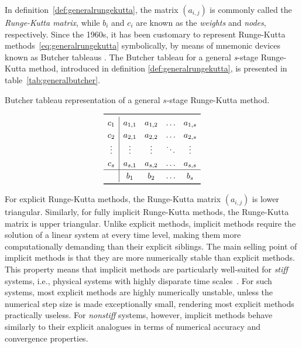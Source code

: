 In definition~\ref{def:generalrungekutta}, the matrix $(a_{i,j})$ is commonly
called the \emph{Runge-Kutta matrix}, while $b_{i}$ and $c_{i}$ are known as
the \emph{weights} and \emph{nodes}, respectively.  Since the 1960s, it has
been customary to represent Runge-Kutta methods~\eqref{eq:generalrungekutta}
symbolically, by means of mnemonic devices known as Butcher tableaus
\parencite[p.134 in the 2008 printing]{hairer1993solving}. The Butcher tableau
for a general \emph{s}-stage Runge-Kutta method, introduced in definition
\ref{def:generalrungekutta}, is presented in table~\ref{tab:generalbutcher}.

\begin{table}[htpb]
    \centering
    \caption[Butcher tableau representation of a general $s$-stage
                Runge-Kutta method]{Butcher tableau representation of a general
                    $s$-stage Runge-Kutta method.}
    \label{tab:generalbutcher}
    \[\renewcommand{\arraystretch}{1.25}
        \begin{array}{c|cccc}
            \toprule
            c_{1} & a_{1,1} & a_{1,2} & \ldots & a_{1,s}\\
            c_{2} & a_{2,1} & a_{2,2} & \ldots & a_{2,s}\\
            \vdots & \vdots & \vdots & \ddots & \vdots \\
            c_{s} & a_{s,1} & a_{s,2} & \ldots & a_{s,s}\\
            \hline
            & b_{1} & b_{2} & \ldots & b_{s}\\
            \bottomrule
    \end{array}
\]
\end{table}

For explicit Runge-Kutta methods, the Runge-Kutta matrix $(a_{i,j})$ is lower
triangular. Similarly, for fully implicit Runge-Kutta methods, the Runge-Kutta
matrix is upper triangular. Unlike explicit methods, implicit methods require
the solution of a linear system at every time level, making them more
computationally demanding than their explicit siblings. The main selling point
of implicit methods is that they are more numerically stable than explicit
methods. This property means that implicit methods are particularly well-suited
for \emph{stiff} systems, i.e., physical systems with highly disparate time
scales~\parencite[p.2 in the 2010 printing]{hairer1996solving}. For such systems,
most explicit methods are highly numerically unstable, unless the numerical step
size is made exceptionally small, rendering most explicit methods practically
useless. For \emph{nonstiff} systems, however, implicit methods behave similarly
to their explicit analogues in terms of numerical accuracy and
convergence properties.

